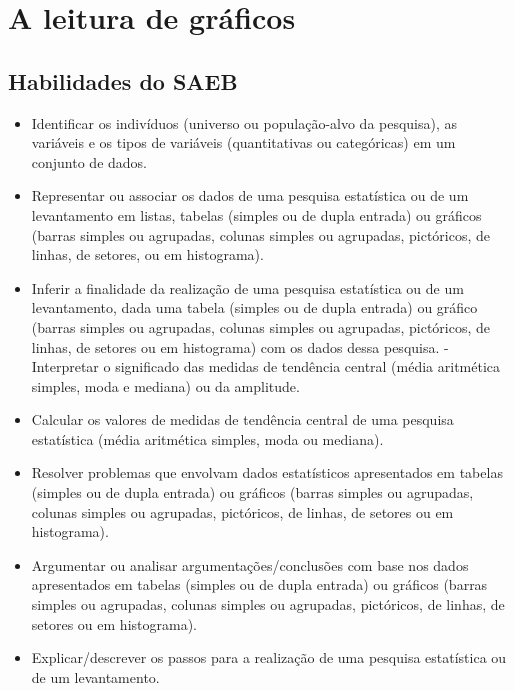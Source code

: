 
\chapter{A leitura de gráficos}

\section{Habilidades do SAEB} 
\begin{itemize}
\item Identificar os indivíduos (universo ou
população-alvo da pesquisa), as variáveis e os tipos de variáveis
(quantitativas ou categóricas) em um conjunto de dados.
\item
  Representar ou associar os dados de uma pesquisa estatística ou de um
  levantamento em listas, tabelas (simples ou de dupla entrada) ou
  gráficos (barras simples ou agrupadas, colunas simples ou agrupadas,
  pictóricos, de linhas, de setores, ou em histograma).
\item
  Inferir a finalidade da realização de uma pesquisa estatística ou de
  um levantamento, dada uma tabela (simples ou de dupla entrada) ou
  gráfico (barras simples ou agrupadas, colunas simples ou agrupadas,
  pictóricos, de linhas, de setores ou em histograma) com os dados dessa
  pesquisa. - Interpretar o significado das medidas de tendência central
  (média aritmética simples, moda e mediana) ou da amplitude.
\item
  Calcular os valores de medidas de tendência central de uma pesquisa
  estatística (média aritmética simples, moda ou mediana).
\item
  Resolver problemas que envolvam dados estatísticos apresentados em
  tabelas (simples ou de dupla entrada) ou gráficos (barras simples ou
  agrupadas, colunas simples ou agrupadas, pictóricos, de linhas, de
  setores ou em histograma).
\item
  Argumentar ou analisar argumentações/conclusões com base nos dados
  apresentados em tabelas (simples ou de dupla entrada) ou gráficos
  (barras simples ou agrupadas, colunas simples ou agrupadas,
  pictóricos, de linhas, de setores ou em histograma).
\item
  Explicar/descrever os passos para a realização de uma pesquisa
  estatística ou de um levantamento.
\end{itemize}

